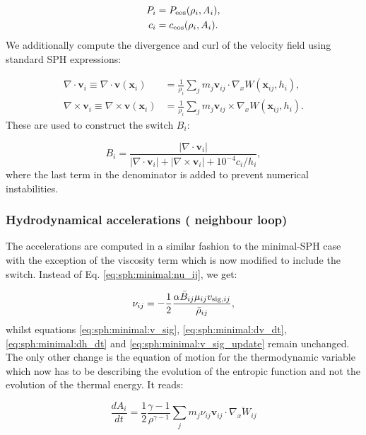 \documentclass[fleqn, usenatbib, useAMS, a4paper]{mnras}
\renewcommand{\vec}[1]{{\mathbf{#1}}}
\newcommand{\Wij}{\overline{\nabla_xW_{ij}}}
\begin{document}
\begin{align}
  P_i &= P_{\rm eos}(\rho_i, A_i),   \label{eq:sph:gadget2:P}\\
  c_i &= c_{\rm eos}(\rho_i, A_i).   \label{eq:sph:gadget2:c}
\end{align}
We additionally compute the divergence and
curl of the velocity field using standard SPH expressions:

\begin{align}
  \nabla\cdot\vec{v}_i \equiv\nabla\cdot \vec{v}(\vec{x}_i) &= \frac{1}{\rho_i} \sum_j m_j
  \vec{v}_{ij}\cdot\nabla_x W(\vec{x}_{ij}, h_i) \label{eq:sph:gadget2:div_v},\\ 
    \nabla\times\vec{v}_i \equiv \nabla\times \vec{v}(\vec{x}_i) &= \frac{1}{\rho_i} \sum_j m_j
  \vec{v}_{ij}\times\nabla_x W(\vec{x}_{ij}, h_i) \label{eq:sph:gadget2:rot_v}.
\end{align}
These are used to construct the \cite{Balsara1995} switch $B_i$:

\begin{equation}
  B_i = \frac{|\nabla\cdot\vec{v}_i|}{|\nabla\cdot\vec{v}_i| +
    |\nabla\times\vec{v}_i| + 10^{-4}c_i / h_i}, \label{eq:sph:gadget2:balsara}
\end{equation}
where the last term in the denominator is added to prevent numerical instabilities.

\subsubsection{Hydrodynamical accelerations ( neighbour loop)}

The accelerations are computed in a similar fashion to the minimal-SPH
case with the exception of the viscosity term which is now modified to
include the switch. Instead of Eq. \ref{eq:sph:minimal:nu_ij}, we get:

\begin{equation}
\nu_{ij} = -\frac{1}{2}\frac{\alpha \bar B_{ij} \mu_{ij} v_{{\rm sig},ij}}{\bar\rho_{ij}},
  \label{eq:sph:gadget2:nu_ij}  
\end{equation}
whilst equations \ref{eq:sph:minimal:v_sig},
\ref{eq:sph:minimal:dv_dt}, \ref{eq:sph:minimal:dh_dt} and
\ref{eq:sph:minimal:v_sig_update} remain unchanged. The only other
change is the equation of motion for the thermodynamic variable which
now has to be describing the evolution of the entropic function and
not the evolution of the thermal energy. It reads:

\begin{equation}
\frac{dA_i}{dt} = \frac{1}{2} \frac{\gamma-1}{\rho^{\gamma-1}} \sum_j
m_j \nu_{ij}\vec{v}_{ij}\cdot \Wij
\end{equation}
\end{document}
